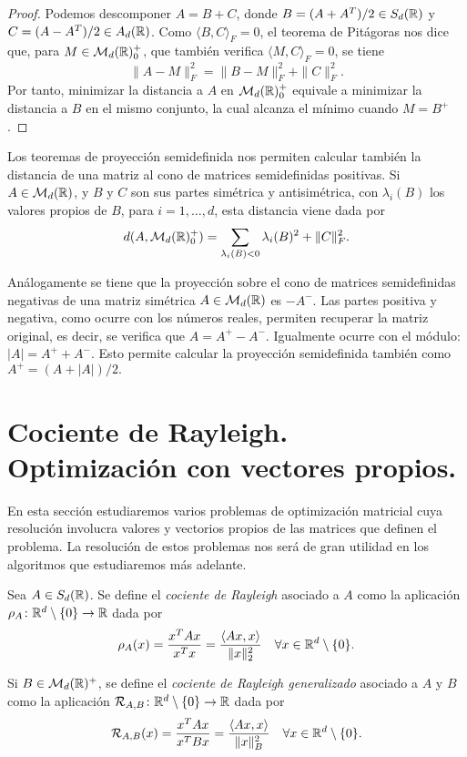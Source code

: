 \begin{proof}
    Podemos descomponer $A = B+C$, donde $B = (A+A^T)/2 \in S_d(\mathbb{R})$ y $C = (A - A^T)/2 \in A_d(\mathbb{R})$. Como $\langle B, C\rangle_F = 0$, el teorema de Pitágoras nos dice que, para $M \in \mathcal{M}_d(\mathbb{R})^+_0$, que también verifica $\langle M, C \rangle_F = 0$, se tiene
    \[ \|A - M\|_F^2 = \|B - M\|_F^2 + \|C\|_F^2. \]
    Por tanto, minimizar la distancia a $A$ en $\mathcal{M}_d(\mathbb{R})^+_0$ equivale a minimizar la distancia a $B$ en el mismo conjunto, la cual alcanza el mínimo cuando $M = B^+$.
\end{proof}

\begin{remark}
    Los teoremas de proyección semidefinida nos permiten calcular también la distancia de una matriz al cono de matrices semidefinidas positivas. Si $A \in \mathcal{M}_d(\mathbb{R})$, y $B$ y $C$ son sus partes simétrica y antisimétrica, con $\lambda_i(B)$ los valores propios de $B$, para $i = 1,\dots,d$, esta distancia viene dada por
    \[ d(A,\mathcal{M}_d(\mathbb{R})^+_0) = \sum_{\lambda_i(B) < 0} \lambda_i(B)^2 + \|C\|^2_F.  \]
\end{remark}

\begin{remark}
    Análogamente se tiene que la proyección sobre el cono de matrices semidefinidas negativas de una matriz simétrica $A \in \mathcal{M}_d(\mathbb{R})$ es $-A^-$. Las partes positiva y negativa, como ocurre con los números reales, permiten recuperar la matriz original, es decir, se verifica que $A = A^+ - A^-$. Igualmente ocurre con el módulo: $|A| = A^+ + A^-$. Esto permite calcular la proyección semidefinida también como $A^+ = (A + |A|)/2.$
\end{remark}

\section{Cociente de Rayleigh. Optimización con vectores propios.}

En esta sección estudiaremos varios problemas de optimización matricial cuya resolución involucra valores y vectorios propios de las matrices que definen el problema. La resolución de estos problemas nos será de gran utilidad en los algoritmos que estudiaremos más adelante.

\begin{definition}
    Sea $A \in S_d(\mathbb{R})$. Se define el \emph{cociente de Rayleigh} asociado a $A$ como la aplicación $\rho_A \colon \mathbb{R}^d \setminus \{0\} \to \mathbb{R}$ dada por
    \[ \rho_A(x) = \frac{x^TAx}{x^Tx} = \frac{\langle Ax, x\rangle}{\|x\|_2^2} \quad \forall x \in \mathbb{R}^d \setminus\{0\}. \]

    Si $B \in \mathcal{M}_d(\mathbb{R})^+$, se define el \emph{cociente de Rayleigh generalizado} asociado a $A$ y $B$ como la aplicación $\mathcal{R}_{A,B} \colon \mathbb{R}^d \setminus \{0\}\to \mathbb{R}$ dada por
    \[ \mathcal{R}_{A,B}(x) = \frac{x^TAx}{x^TBx} = \frac{\langle Ax ,x \rangle}{\|x\|_B^2} \quad \forall x \in \mathbb{R}^d \setminus \{0\}.\]
\end{definition}

